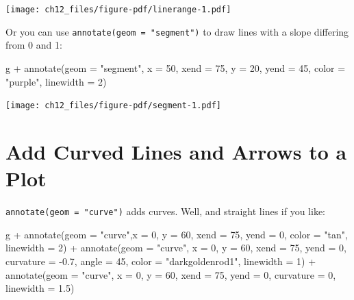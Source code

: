 \documentclass[
  letterpaper,
]{scrbook}
\newenvironment{Shaded}{\begin{snugshade}}{\end{snugshade}}
\newcommand{\AttributeTok}[1]{\textcolor[rgb]{0.40,0.45,0.13}{#1}}
\newcommand{\DecValTok}[1]{\textcolor[rgb]{0.68,0.00,0.00}{#1}}
\newcommand{\FloatTok}[1]{\textcolor[rgb]{0.68,0.00,0.00}{#1}}
\newcommand{\FunctionTok}[1]{\textcolor[rgb]{0.28,0.35,0.67}{#1}}
\newcommand{\NormalTok}[1]{\textcolor[rgb]{0.00,0.23,0.31}{#1}}
\newcommand{\SpecialCharTok}[1]{\textcolor[rgb]{0.37,0.37,0.37}{#1}}
\newcommand{\StringTok}[1]{\textcolor[rgb]{0.13,0.47,0.30}{#1}}
\begin{document}
\texttt{[image: ch12\_files/figure-pdf/linerange-1.pdf]}

Or you can use \texttt{annotate(geom\ =\ "segment")} to draw lines with
a slope differing from 0 and 1:

\begin{Shaded}
\begin{Highlighting}[]
\NormalTok{g }\SpecialCharTok{+}
  \FunctionTok{annotate}\NormalTok{(}\AttributeTok{geom =} \StringTok{"segment"}\NormalTok{, }
           \AttributeTok{x =} \DecValTok{50}\NormalTok{, }\AttributeTok{xend =} \DecValTok{75}\NormalTok{,}
                   \AttributeTok{y =} \DecValTok{20}\NormalTok{, }\AttributeTok{yend =} \DecValTok{45}\NormalTok{,}
               \AttributeTok{color =} \StringTok{"purple"}\NormalTok{, }\AttributeTok{linewidth =} \DecValTok{2}\NormalTok{)}
\end{Highlighting}
\end{Shaded}

\texttt{[image: ch12\_files/figure-pdf/segment-1.pdf]}

\section{Add Curved Lines and Arrows to a
Plot}\label{add-curved-lines-and-arrows-to-a-plot}

\texttt{annotate(geom\ =\ "curve")} adds curves. Well, and straight
lines if you like:

\begin{Shaded}
\begin{Highlighting}[]
\NormalTok{g }\SpecialCharTok{+}
  \FunctionTok{annotate}\NormalTok{(}\AttributeTok{geom =} \StringTok{"curve"}\NormalTok{,}\AttributeTok{x =} \DecValTok{0}\NormalTok{, }\AttributeTok{y =} \DecValTok{60}\NormalTok{, }\AttributeTok{xend =} \DecValTok{75}\NormalTok{, }\AttributeTok{yend =} \DecValTok{0}\NormalTok{,}
             \AttributeTok{color =} \StringTok{"tan"}\NormalTok{, }\AttributeTok{linewidth =} \DecValTok{2}\NormalTok{) }\SpecialCharTok{+}
  \FunctionTok{annotate}\NormalTok{(}\AttributeTok{geom =} \StringTok{"curve"}\NormalTok{, }
           \AttributeTok{x =} \DecValTok{0}\NormalTok{, }\AttributeTok{y =} \DecValTok{60}\NormalTok{, }\AttributeTok{xend =} \DecValTok{75}\NormalTok{, }\AttributeTok{yend =} \DecValTok{0}\NormalTok{,}
             \AttributeTok{curvature =} \SpecialCharTok{{-}}\FloatTok{0.7}\NormalTok{, }\AttributeTok{angle =} \DecValTok{45}\NormalTok{,}
             \AttributeTok{color =} \StringTok{"darkgoldenrod1"}\NormalTok{, }\AttributeTok{linewidth =} \DecValTok{1}\NormalTok{) }\SpecialCharTok{+}
  \FunctionTok{annotate}\NormalTok{(}\AttributeTok{geom =} \StringTok{"curve"}\NormalTok{, }\AttributeTok{x =} \DecValTok{0}\NormalTok{, }\AttributeTok{y =} \DecValTok{60}\NormalTok{, }\AttributeTok{xend =} \DecValTok{75}\NormalTok{, }\AttributeTok{yend =} \DecValTok{0}\NormalTok{,}
             \AttributeTok{curvature =} \DecValTok{0}\NormalTok{, }\AttributeTok{linewidth =} \FloatTok{1.5}\NormalTok{)}
\end{Highlighting}
\end{Shaded}
\end{document}
